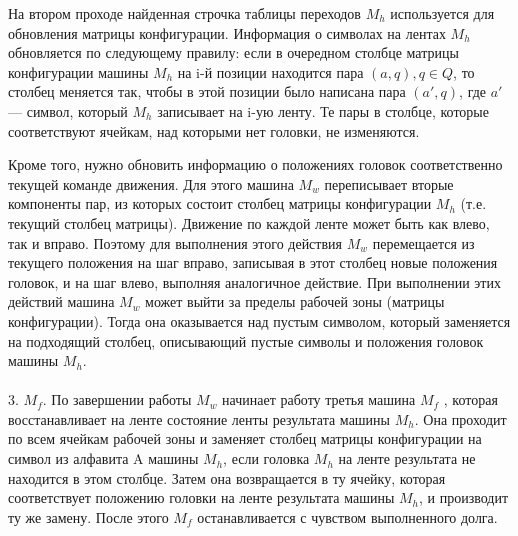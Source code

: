 На втором проходе найденная строчка таблицы переходов $M_h$ используется для обновления
матрицы конфигурации. Информация о символах на лентах $M_h$ обновляется по следующему
правилу: если в очередном столбце матрицы конфигурации машины $M_h$ на i-й позиции находится пара $(a, q), q \in Q$, то столбец меняется так, чтобы в этой позиции было написана пара
$(a', q)$, где $a'$ — символ, который $M_h$ записывает на i-ую ленту. Те пары в столбце, которые
соответствуют ячейкам, над которыми нет головки, не изменяются.


Кроме того, нужно обновить информацию о положениях головок соответственно текущей
команде движения. Для этого машина $M_w$ переписывает вторые компоненты пар, из которых
состоит столбец матрицы конфигурации $M_h$ (т.е. текущий столбец матрицы). Движение по
каждой ленте может быть как влево, так и вправо. Поэтому для выполнения этого действия
$M_w$ перемещается из текущего положения на шаг вправо, записывая в этот столбец новые
положения головок, и на шаг влево, выполняя аналогичное действие. При выполнении этих
действий машина $M_w$ может выйти за пределы рабочей зоны (матрицы конфигурации). Тогда
она оказывается над пустым символом, который заменяется на подходящий столбец, описывающий пустые символы и положения головок машины $M_h$.
\\
\\
3. $M_f$. По завершении работы $M_w$ начинает работу третья машина $M_f$ , которая восстанавливает на ленте состояние ленты результата машины $M_h$. Она проходит по всем ячейкам рабочей зоны и
заменяет столбец матрицы конфигурации на символ из алфавита A машины $M_h$, если головка
$M_h$ на ленте результата не находится в этом столбце. Затем она возвращается в ту ячейку,
которая соответствует положению головки на ленте результата машины $M_h$, и производит ту
же замену. После этого $M_f$ останавливается с чувством выполненного долга.